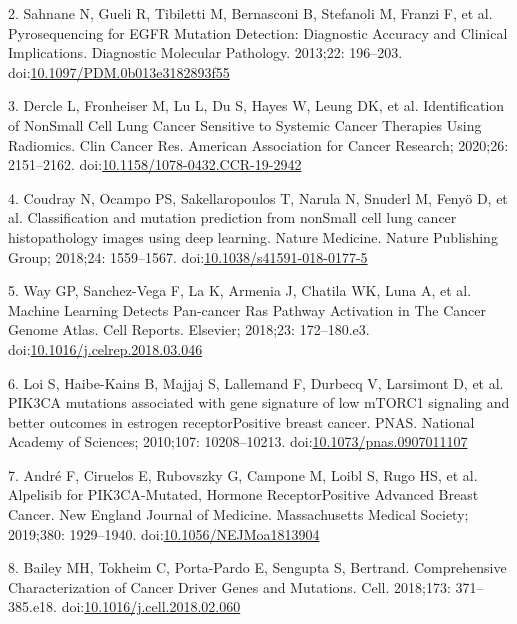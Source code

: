 \documentclass[10pt,letterpaper]{article}
\begin{document}
\leavevmode\hypertarget{ref-sahnanePyrosequencingEGFRMutation2013}{}%
2. Sahnane N, Gueli R, Tibiletti M, Bernasconi B, Stefanoli M, Franzi F,
et al. Pyrosequencing for EGFR Mutation Detection: Diagnostic Accuracy
and Clinical Implications. Diagnostic Molecular Pathology. 2013;22:
196--203.
doi:\href{https://doi.org/10.1097/PDM.0b013e3182893f55}{10.1097/PDM.0b013e3182893f55}

\leavevmode\hypertarget{ref-dercleIdentificationNonSmall2020}{}%
3. Dercle L, Fronheiser M, Lu L, Du S, Hayes W, Leung DK, et al.
Identification of NonSmall Cell Lung Cancer Sensitive to Systemic Cancer
Therapies Using Radiomics. Clin Cancer Res. American Association for
Cancer Research; 2020;26: 2151--2162.
doi:\href{https://doi.org/10.1158/1078-0432.CCR-19-2942}{10.1158/1078-0432.CCR-19-2942}

\leavevmode\hypertarget{ref-coudrayClassificationMutationPrediction2018}{}%
4. Coudray N, Ocampo PS, Sakellaropoulos T, Narula N, Snuderl M, Fenyö
D, et al. Classification and mutation prediction from nonSmall cell lung
cancer histopathology images using deep learning. Nature Medicine.
Nature Publishing Group; 2018;24: 1559--1567.
doi:\href{https://doi.org/10.1038/s41591-018-0177-5}{10.1038/s41591-018-0177-5}

\leavevmode\hypertarget{ref-wayMachineLearningDetects2018}{}%
5. Way GP, Sanchez-Vega F, La K, Armenia J, Chatila WK, Luna A, et al.
Machine Learning Detects Pan-cancer Ras Pathway Activation in The Cancer
Genome Atlas. Cell Reports. Elsevier; 2018;23: 172--180.e3.
doi:\href{https://doi.org/10.1016/j.celrep.2018.03.046}{10.1016/j.celrep.2018.03.046}

\leavevmode\hypertarget{ref-loiPIK3CAMutationsAssociated2010}{}%
6. Loi S, Haibe-Kains B, Majjaj S, Lallemand F, Durbecq V, Larsimont D,
et al. PIK3CA mutations associated with gene signature of low mTORC1
signaling and better outcomes in estrogen receptorPositive breast
cancer. PNAS. National Academy of Sciences; 2010;107: 10208--10213.
doi:\href{https://doi.org/10.1073/pnas.0907011107}{10.1073/pnas.0907011107}

\leavevmode\hypertarget{ref-andre_2019_alpelisib_nengljmeda}{}%
7. André F, Ciruelos E, Rubovszky G, Campone M, Loibl S, Rugo HS, et al.
Alpelisib for PIK3CA-Mutated, Hormone ReceptorPositive Advanced Breast
Cancer. New England Journal of Medicine. Massachusetts Medical Society;
2019;380: 1929--1940.
doi:\href{https://doi.org/10.1056/NEJMoa1813904}{10.1056/NEJMoa1813904}

\leavevmode\hypertarget{ref-baileyComprehensiveCharacterizationCancer2018}{}%
8. Bailey MH, Tokheim C, Porta-Pardo E, Sengupta S, Bertrand.
Comprehensive Characterization of Cancer Driver Genes and Mutations.
Cell. 2018;173: 371--385.e18.
doi:\href{https://doi.org/10.1016/j.cell.2018.02.060}{10.1016/j.cell.2018.02.060}
\end{document}
